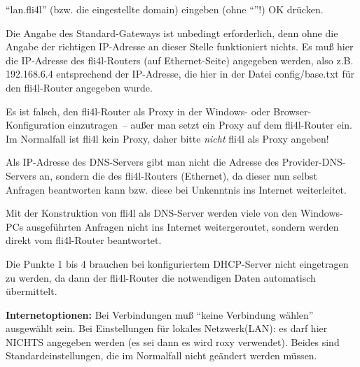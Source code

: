   ``lan.fli4l'' (bzw. die eingestellte domain) eingeben (ohne ``''!)
  \pfeil OK drücken.

  Die Angabe des Standard-Gateways ist unbedingt erforderlich, denn
  ohne die Angabe der richtigen IP-Adresse an dieser Stelle
  funktioniert nichts.  Es muß hier die IP-Adresse des fli4l-Routers
  (auf Ethernet-Seite) angegeben werden, also z.B. 192.168.6.4
  entsprechend der IP-Adresse, die hier in der Datei config/base.txt
  für den fli4l-Router angegeben wurde.

  Es ist falsch, den fli4l-Router als Proxy in der Windows- oder
  Browser- Konfiguration einzutragen~-- außer man setzt ein Proxy auf
  dem fli4l-Router ein. Im Normalfall ist fli4l kein Proxy, daher
  bitte \emph{nicht} fli4l als Proxy angeben!


  Als IP-Adresse des DNS-Servers gibt man nicht die Adresse des
  Provider-DNS-Servers an, sondern die des fli4l-Routers (Ethernet),
  da dieser nun selbst Anfragen beantworten kann bzw. diese bei
  Unkenntnis ins Internet weiterleitet.

  Mit der Konstruktion von fli4l als DNS-Server werden viele von den
  Windows-PCs ausgeführten Anfragen nicht ins Internet weitergeroutet,
  sondern werden direkt vom fli4l-Router beantwortet.


  Die Punkte 1 bis 4 brauchen bei konfiguriertem DHCP-Server nicht
  eingetragen zu werden, da dann der fli4l-Router die notwendigen Daten
  automatisch übermittelt.

  \textbf{Internetoptionen:} Bei Verbindungen muß ``keine Verbindung wählen'' ausgewählt sein.
  Bei Einstellungen für lokales Netzwerk(LAN): es darf hier NICHTS
  angegeben werden (es sei dann es wird roxy verwendet).
  Beides sind Standardeinstellungen, die im Normalfall nicht geändert
  werden müssen.

